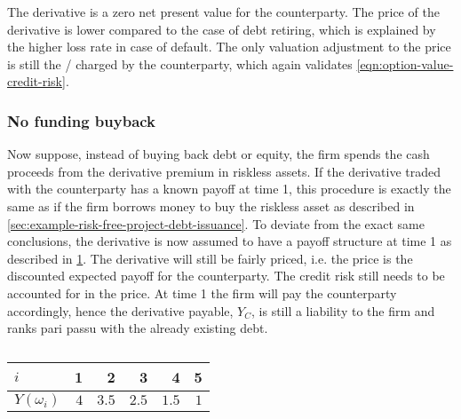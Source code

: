 \documentclass[../main.tex]{subfiles}
\begin{document}
            The derivative is a zero net present value for the counterparty. 
            The price of the derivative is lower compared to the case of debt retiring, 
            which is explained by the higher loss rate in case of default. 
            The only valuation adjustment to the price is still the \CVA/ charged by the counterparty, 
            which again validates \cref{eqn:option-value-credit-risk}.

        \subsubsection{No funding buyback}
            Now suppose, instead of buying back debt or equity, 
            the firm spends the cash proceeds from the derivative premium in riskless assets. 
            If the derivative traded with the counterparty has a known payoff at time 1, this procedure is exactly the same as if the firm borrows money to buy the riskless asset 
            as described in \cref{sec:example-risk-free-project-debt-issuance}. 
            To deviate from the exact same conclusions, the derivative is now assumed to have a payoff structure at time 1 
            as described in \cref{tbl:risky-option-payoff}. 
            The derivative will still be fairly priced, i.e. the price is the discounted expected payoff for the counterparty. 
            The credit risk still needs to be accounted for in the price. 
            At time 1 the firm will pay the counterparty accordingly, hence the derivative payable, $Y_C$, 
            is still a liability to the firm and ranks pari passu with the already existing debt.
            
            \begin{table}[H]
                \centering
                \begin{tabular}{l|rrrrr}
                    $i$ & 1 & 2 & 3 & 4 & 5 \\
                    \hline
                    $Y(\omega_{i})$ & $4$ & $3.5$ & $2.5$ & $1.5$ & $1$ \\
                \end{tabular}
                \caption{}
                \label{tbl:risky-option-payoff}
            \end{table}
\end{document}
